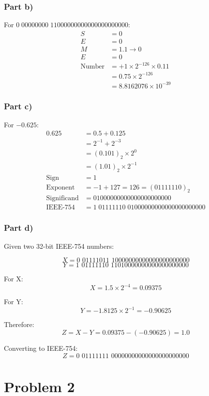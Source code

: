 \documentclass{article}
\begin{document}
\subsubsection*{Part b)}
For \(0 \; 00000000 \; 11000000000000000000000\):
\begin{align*}
S &= 0 \\
E &= 0 \\
M &= 1.1 \rightarrow 0 \\
E &= 0 \\
\text{Number} &= +1 \times 2^{-126} \times 0.11 \\
&= 0.75 \times 2^{-126} \\
&= 8.8162076 \times 10^{-39}
\end{align*}

\subsubsection*{Part c)}
For \(-0.625\):
\begin{align*}
0.625 &= 0.5 + 0.125 \\
&= 2^{-1} + 2^{-3} \\
&= (0.101)_2 \times 2^0 \\
&= (1.01)_2 \times 2^{-1} \\
\text{Sign} &= 1 \\
\text{Exponent} &= -1 + 127 = 126 = (01111110)_2 \\
\text{Significand} &= 01000000000000000000000 \\
\text{IEEE-754} &= 1 \; 01111110 \; 01000000000000000000000
\end{align*}

\subsubsection*{Part d)}
Given two 32-bit IEEE-754 numbers:

$$X = \text{0 01111011 10000000000000000000000}$$
$$Y = \text{1 01111110 11010000000000000000000}$$

For X:
$$X = 1.5 \times 2^{-4} = 0.09375$$

For Y: 
$$Y = -1.8125 \times 2^{-1} = -0.90625$$

Therefore:
$$Z = X - Y = 0.09375 - (-0.90625) = 1.0$$

Converting to IEEE-754:
$$Z = \text{0 01111111 00000000000000000000000}$$

\section*{Problem 2}
\end{document}
